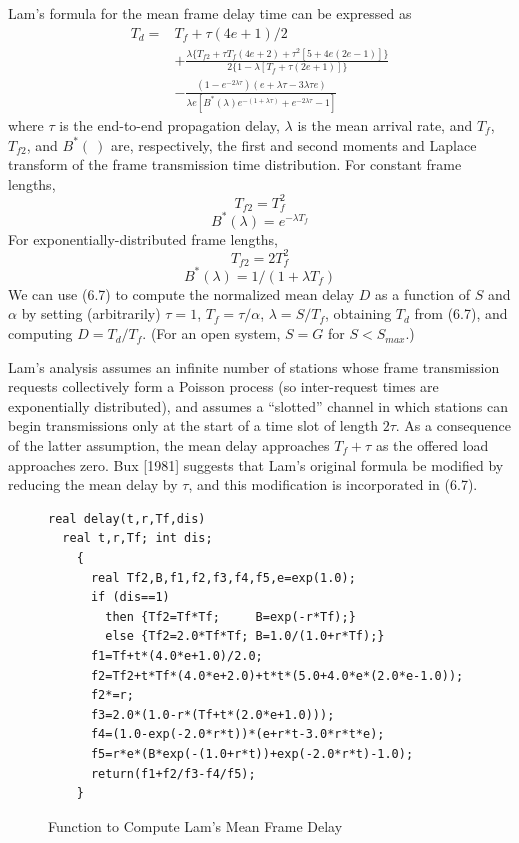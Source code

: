 Lam's formula for the mean frame delay time can be expressed as
\begin{equation}
\begin{aligned}
T_d={}&T_f+\tau(4e+1)/2\\
&+\frac{\lambda\{T_{f2}+\tau T_f(4e+2)+\tau^2[5+4e(2e-1)]\}}{2\{1-\lambda[T_f+\tau(2e+1)]\}}\\
&-\frac{(1-e^{-2\lambda\tau})(e+\lambda\tau-3\lambda\tau e)}{\lambda e[B^*(\lambda)e^{-(1+\lambda\tau)}+e^{-2\lambda\tau}-1]}
\end{aligned}
\end{equation}
where $\tau$ is the end-to-end propagation delay, $\lambda$ is the mean arrival rate, and $T_f$, $T_{f2}$, and $B^*(\ )$ are, respectively, the first and second moments and Laplace transform of the frame transmission time distribution. For constant frame lengths,
\begin{equation} T_{f2}=T_f^2 \tag{6.8a} \end{equation}
\begin{equation} B^*(\lambda)=e^{-\lambda T_f} \tag{6.8b} \end{equation}
For exponentially-distributed frame lengths,
\begin{equation} T_{f2}=2T_f^2 \tag{6.9a} \end{equation}
\begin{equation} B^*(\lambda)=1/(1+\lambda T_f) \tag{6.9b} \end{equation}
\setcounter{equation}{9}%
We can use (6.7) to compute the normalized mean delay $D$ as a function of $S$ and $\alpha$ by setting (arbitrarily) $\tau=1$, $T_f=\tau/\alpha$, $\lambda=S/T_f$, obtaining $T_d$ from (6.7), and computing $D=T_d/T_f$. (For an open system, $S=G$ for $S<S_{max}$.)

Lam's analysis assumes an infinite number of stations whose frame transmission requests collectively form a Poisson process (so inter-request times are exponentially distributed), and assumes a ``slotted'' channel in which stations can begin transmissions only at the start of a time slot of length $2\tau$. As a consequence of the latter assumption, the mean delay approaches $T_f+\tau$ as the offered load approaches zero. Bux [1981] suggests that Lam's original formula be modified by reducing the mean delay by $\tau$, and this modification is incorporated in (6.7).

\begin{figure}[htbp]
\begin{verbatim}
real delay(t,r,Tf,dis)
  real t,r,Tf; int dis;
    {
      real Tf2,B,f1,f2,f3,f4,f5,e=exp(1.0);
      if (dis==1)
        then {Tf2=Tf*Tf;     B=exp(-r*Tf);}
        else {Tf2=2.0*Tf*Tf; B=1.0/(1.0+r*Tf);}
      f1=Tf+t*(4.0*e+1.0)/2.0;
      f2=Tf2+t*Tf*(4.0*e+2.0)+t*t*(5.0+4.0*e*(2.0*e-1.0));
      f2*=r;
      f3=2.0*(1.0-r*(Tf+t*(2.0*e+1.0)));
      f4=(1.0-exp(-2.0*r*t))*(e+r*t-3.0*r*t*e);
      f5=r*e*(B*exp(-(1.0+r*t))+exp(-2.0*r*t)-1.0);
      return(f1+f2/f3-f4/f5);
    }
\end{verbatim}
\caption{Function to Compute Lam's Mean Frame Delay}
\end{figure}

